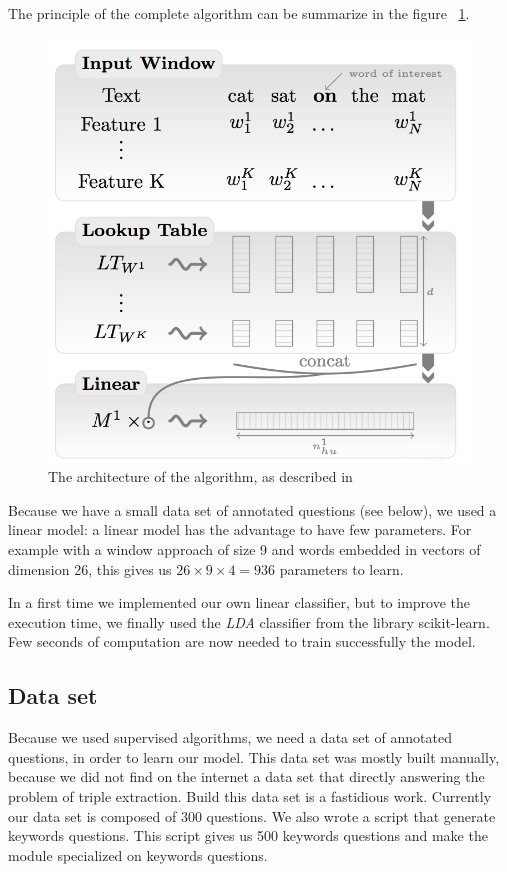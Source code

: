 The principle of the complete algorithm can be summarize in the figure ~\ref{sandalone:model}.

\begin{figure}[!ht]
  \centering
  \caption{The architecture of the algorithm, as described in \cite{collobert}}
  \label{sandalone:model}
    \includegraphics[scale=0.5]{../NLP-standalone-images/model.png}
\end{figure}

Because we have a small data set of annotated questions (see below), we used a linear model: a linear model has the advantage to have few parameters.
For example with a window approach of size 9 and words embedded in vectors of dimension 26,  this gives us $26\times 9\times 4 = 936$ parameters to learn.

In a first time we implemented our own linear classifier, but to improve the execution time, we finally used the \textit{LDA} classifier from the library scikit-learn. Few seconds of computation are now needed to train successfully the model.

\subsection{Data set}

Because we used supervised algorithms, we need a data set of annotated questions, in order to learn our model.
This data set was mostly built manually, because we did not find on the internet a data set that directly answering the problem of triple extraction.
Build this data set is a fastidious work. Currently our data set is composed of 300 questions.
We also wrote a script that generate keywords questions. This script gives us 500 keywords questions and make the module specialized on keywords questions.

